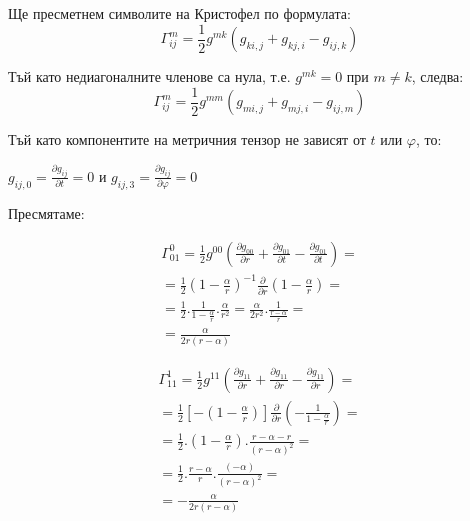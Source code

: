 \documentclass[a4paper,12pt]{article}
\begin{document}
Ще пресметнем символите на Кристофел по формулата:
\begin{equation*}
    \varGamma^m_{ij} = \frac{1}{2}g^{mk}(g_{ki,j} + g_{kj,i}-g_{ij,k})
\end{equation*}

Тъй като недиагоналните членове са нула, т.е. $g^{mk}=0$ при $m \neq k$, следва:
\begin{equation*}
    \varGamma^m_{ij} = \frac{1}{2}g^{mm}(g_{mi,j}+g_{mj,i} - g_{ij, m})
\end{equation*}

Тъй като компонентите на метричния тензор не зависят от $t$ или $\varphi$, то:

    $g_{ij, 0} = \frac{\partial g_{ij}}{\partial t} =0$ и 
    $g_{ij, 3} = \frac{\partial g_{ij}}{\partial \varphi} =0$

    Пресмятаме: 

    \begin{equation}
        \begin{aligned}
        \varGamma^0_{01} = \frac{1}{2}g^{00}\left(\frac{\partial g_{00}}{\partial r} + \frac{\partial g_{01}}{\partial t} - \frac{\partial g_{01}}{\partial t}\right) =\\
        = \frac{1}{2}\left( 1- \frac{\alpha}{r}\right)^{-1} \frac{\partial}{\partial r}\left(1 - \frac{\alpha}{r}\right) =\\
        = \frac{1}{2}.\frac{1}{1 - \frac{\alpha}{r}}.\frac{\alpha}{r^2} = \frac{\alpha}{2r^2}.\frac{1}{\frac{r-\alpha}{r}} =\\ 
        = \frac{\alpha}{2r(r-\alpha)}
        \end{aligned}
    \end{equation}
    \newline

    \begin{equation}
        \begin{aligned}
        \varGamma^1_{11} = \frac{1}{2}g^{11}\left(\frac{\partial g_{11}}{\partial r} + \frac{\partial g_{11}}{\partial r} - \frac{\partial g_{11}}{\partial r}\right) =\\
        = \frac{1}{2}\left[ - \left( 1- \frac{\alpha}{r}\right)\right] \frac{\partial}{\partial r}\left(- \frac{1}{1-\frac{\alpha}{r}}\right) =\\
        = \frac{1}{2}.\left( 1- \frac{\alpha}{r}\right).\frac{r -\alpha - r}{(r-\alpha)^2} =\\ 
        = \frac{1}{2}.\frac{r-\alpha}{r}.\frac{(-\alpha)}{(r-\alpha)^2} = \\
        = -\frac{\alpha}{2r(r-\alpha)}
        \end{aligned}
    \end{equation}
    \newline
\end{document}
